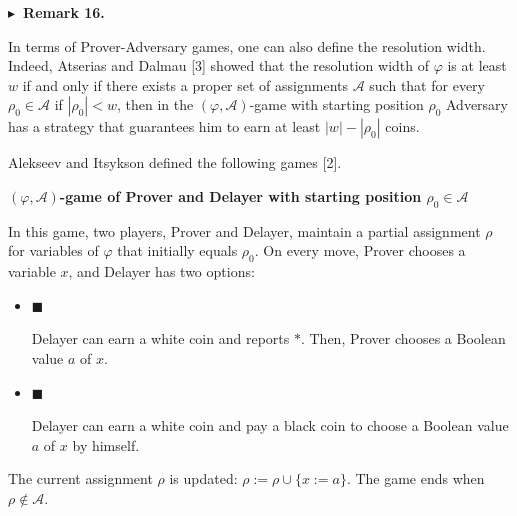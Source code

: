\documentclass[10pt,a4paper]{article}
\begin{document}
\par\medskip\noindent\textbf{
$\blacktriangleright$ Remark 16.
}\par



In terms of Prover-Adversary games, one can also define the resolution width.
Indeed, Atserias and Dalmau [3] showed that the resolution width of $\varphi$
is at least $w$ if and only if there exists a proper set of assignments $\mathcal{A}$
such that for every $\rho_{0}\in\mathcal{A}$ if $|\rho_{0}|<w$, then in the
$(\varphi,\mathcal{A})$-game with starting position $\rho_{0}$ Adversary has a strategy
that guarantees him to earn at least $|w|-|\rho_{0}|$ coins.\par




Alekseev and Itsykson defined the following games [2].\par


\par\medskip\noindent\textbf{
$(\varphi,\mathcal{A})$-game of Prover and Delayer with starting position $\rho_{0}\in\mathcal{A}$
}\par


In this game, two players, Prover and Delayer, maintain a partial assignment $\rho$ for
variables of $\varphi$ that initially equals $\rho_{0}$.
On every move, Prover chooses a variable $x$, and Delayer has two options:\par


\begin{itemize}


\item 
$\blacksquare$ 


Delayer can earn a white coin and reports $*$.
Then, Prover chooses a Boolean value $a$ of $x$.\par





\item 
$\blacksquare$ 


Delayer can earn a white coin and pay a black
coin to choose a Boolean value $a$ of $x$ by himself.\par





\end{itemize}


The current assignment $\rho$ is updated: $\rho:=\rho\cup\{x:=a\}$. The game ends when $\rho\notin\mathcal{A}$.\par
\end{document}
